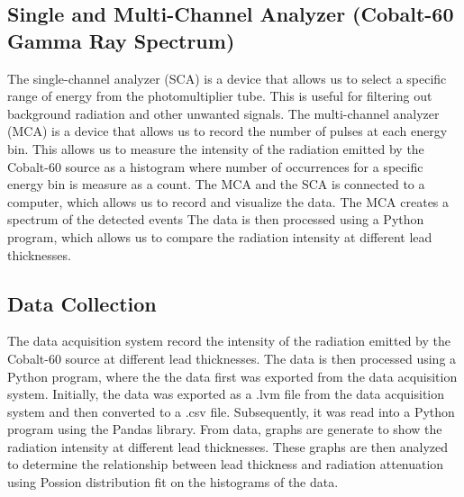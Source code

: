 \documentclass[12pt]{article}
\begin{document}
        \subsection{Single and Multi-Channel Analyzer (Cobalt-60 Gamma Ray Spectrum)}
            The single-channel analyzer (SCA) is a device that allows us to select a specific range of energy from the photomultiplier tube. 
            This is useful for filtering out background radiation and other unwanted signals. 
            The multi-channel analyzer (MCA) is a device that allows us to record the number of pulses at each energy bin. 
            This allows us to measure the intensity of the radiation emitted by the Cobalt-60 source as a histogram 
            where number of occurrences for a specific energy bin is measure as a count. 
            The MCA and the SCA is connected to a computer, which allows us to record and visualize the data. The MCA creates a spectrum of the detected events
            The data is then processed using a Python program, which allows us to compare the radiation intensity at different lead thicknesses.
            
        \subsection{Data Collection}
            The data acquisition system record the intensity of the radiation emitted by the Cobalt-60 source at different lead thicknesses. 
            The data is then processed using a Python program, where the the data first was exported from the data acquisition system.
            Initially, the data was exported as a .lvm file from the data acquisition system and then converted to a .csv file. 
            Subsequently, it was read into a Python program using the Pandas library.
            From data, graphs are generate to show the radiation intensity at different lead thicknesses. 
            These graphs are then analyzed to determine the relationship between lead thickness and radiation attenuation using 
            Possion distribution fit on the histograms of the data.
            
\end{document}
